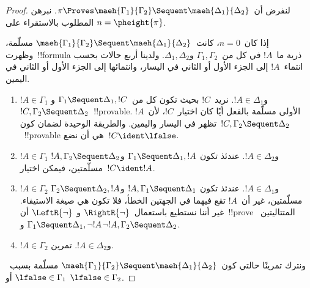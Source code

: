 \documentclass[../../../include/open-logic-section]{subfiles}
\begin{document}
\begin{proof}
  لنفرض أن~$\pi \Proves \maeh{\Gamma_1}{\Gamma_2} \Sequent
  \maeh{\Delta_1}{\Delta_2}$. نبرهن المطلوب بالاستقراء على
  $n=\pheight{\pi}$.

  إذا كان~$n=0$، كانت~$\maeh{\Gamma_1}{\Gamma_2} \Sequent
  \maeh{\Delta_1}{\Delta_2}$ مسلّمة، وظهرت~!!{formula} ذرية ما~$!A$
  في كل من~$\Gamma_1, \Gamma_2$ و$\Delta_1, \Delta_2$. ولدينا أربع
  حالات بحسب انتماء~$!A$ إلى الجزء الأول أو الثاني في اليسار، وانتمائها
  إلى الجزء الأول أو الثاني في اليمين.
  \begin{enumerate}
    \item $!A \in \Gamma_1$ و$!A \in \Delta_1$. نريد~$!C$ بحيث
    تكون كل من~$\Gamma_1 \Sequent \Delta_1, !C$ و$!C, \Gamma_2
    \Sequent \Delta_2$~!!{provable}. الأولى مسلّمة بالفعل أيًا كان
    اختيار~$!C$، لأن~$!A$ تظهر في اليسار واليمين. والطريقة الوحيدة
    لضمان كون~$!C, \Gamma_2 \Sequent \Delta_2$~!!{provable} هي أن
    نضع~$!C \ident \lfalse$.
    \item $!A \in \Gamma_1$ و$!A \in \Delta_2$. عندئذ تكون
    $\Gamma_1 \Sequent \Delta_1, !A$ و$!A, \Gamma_2 \Sequent
    \Delta_2$ مسلّمتين، فيمكن اختيار~$!C \ident !A$.
    \item $!A \in \Gamma_2$ و$!A \in \Delta_1$. عندئذ تكون
    $!A, \Gamma_1 \Sequent \Delta_1$ و$\Gamma_2 \Sequent \Delta_2,
    !A$ مسلّمتين، غير أن~$!A$ تقع فيهما في الجهتين الخطأ، فلا تكون هي صيغة
    الاستيفاء. غير أننا نستطيع باستعمال~$\RightR{\lnot}$ و
    $\LeftR{\lnot}$ أن~!!{prove} المتتاليتين~$\Gamma_1
    \Sequent \Delta_1, \lnot!A$ و$\lnot !A, \Gamma_2 \Sequent
    \Delta_2$.
    \item $!A \in \Gamma_2$ و$!A \in \Delta_2$. تمرين.
  \end{enumerate}
  ونترك تمرينًا حالتي كون~$\maeh{\Gamma_1}{\Gamma_2} \Sequent
  \maeh{\Delta_1}{\Delta_2}$ مسلّمة بسبب~$\lfalse \in \Gamma_1$ أو
  $\lfalse \in \Gamma_2$.


\end{proof}
\end{document}

